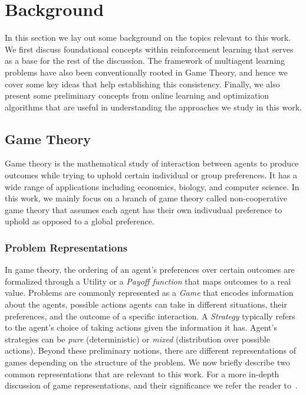 \chapter{Background}
In this section we lay out some background on the topics relevant to this work.
We first discuss foundational concepts within reinforcement learning that serves as a base for the
rest of the discussion.
The framework of multiagent learning problems have also been conventionally rooted in Game Theory,
and hence we cover some key ideas that help establishing this consistency.
Finally, we also present some preliminary concepts from online learning and optimization algorithms
that are useful in understanding the approaches we study in this work.

\section{Game Theory}

Game theory is the mathematical study of interaction between agents to produce outcomes while
trying to uphold certain individual or group preferences.
It has a wide range of applications including economics, biology, and computer science.
In this work, we mainly focus on a branch of game theory called non-cooperative game theory that
assumes each agent has their own indivudual preference to uphold as opposed to a global preference.

\subsection{Problem Representations}
\label{subsec:reps}
In game theory, the ordering of an agent's preferences over certain outcomes are formalized through
a Utility or a \textit{Payoff function} that maps outcomes to a real value.
Problems are commonly represented as a \textit{Game} that encodes information about the agents,
possible actions agents can take in different situations, their preferences, and the outcome of a
specific interaction.
A \textit{Strategy} typically refers to the agent's choice of taking actions given the information
it has.
Agent's strategies can be \textit{pure} (deterministic) or \textit{mixed} (distribution over
possible actions).
Beyond these preliminary notions, there are different representations of games depending on the
structure of the problem.
We now briefly describe two common representations that are relevant to this work.
For a more in-depth discussion of game representations, and their significance we refer the reader
to~\cite{shohamMultiagent2008}.

